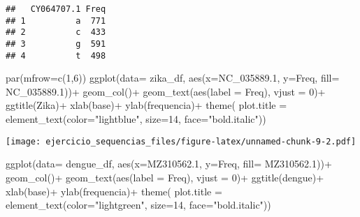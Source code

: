 \documentclass[
]{article}
\newenvironment{Shaded}{\begin{snugshade}}{\end{snugshade}}
\newcommand{\AttributeTok}[1]{\textcolor[rgb]{0.77,0.63,0.00}{#1}}
\newcommand{\DecValTok}[1]{\textcolor[rgb]{0.00,0.00,0.81}{#1}}
\newcommand{\FloatTok}[1]{\textcolor[rgb]{0.00,0.00,0.81}{#1}}
\newcommand{\FunctionTok}[1]{\textcolor[rgb]{0.00,0.00,0.00}{#1}}
\newcommand{\NormalTok}[1]{#1}
\newcommand{\SpecialCharTok}[1]{\textcolor[rgb]{0.00,0.00,0.00}{#1}}
\newcommand{\StringTok}[1]{\textcolor[rgb]{0.31,0.60,0.02}{#1}}
\begin{document}
\begin{verbatim}
##   CY064707.1 Freq
## 1          a  771
## 2          c  433
## 3          g  591
## 4          t  498
\end{verbatim}

\begin{Shaded}
\begin{Highlighting}[]
\FunctionTok{par}\NormalTok{(}\AttributeTok{mfrow=}\FunctionTok{c}\NormalTok{(}\DecValTok{1}\NormalTok{,}\DecValTok{6}\NormalTok{))}
\FunctionTok{ggplot}\NormalTok{(}\AttributeTok{data=}\NormalTok{ zika\_df, }\FunctionTok{aes}\NormalTok{(}\AttributeTok{x=}\NormalTok{NC\_035889}\FloatTok{.1}\NormalTok{, }\AttributeTok{y=}\NormalTok{Freq, }\AttributeTok{fill=}\NormalTok{ NC\_035889}\FloatTok{.1}\NormalTok{))}\SpecialCharTok{+}
   \FunctionTok{geom\_col}\NormalTok{()}\SpecialCharTok{+}
   \FunctionTok{geom\_text}\NormalTok{(}\FunctionTok{aes}\NormalTok{(}\AttributeTok{label =}\NormalTok{ Freq), }\AttributeTok{vjust =} \DecValTok{0}\NormalTok{)}\SpecialCharTok{+}
   \FunctionTok{ggtitle}\NormalTok{(}\StringTok{\textquotesingle{}Zika\textquotesingle{}}\NormalTok{)}\SpecialCharTok{+}
   \FunctionTok{xlab}\NormalTok{(}\StringTok{\textquotesingle{}base\textquotesingle{}}\NormalTok{)}\SpecialCharTok{+}
   \FunctionTok{ylab}\NormalTok{(}\StringTok{\textquotesingle{}frequencia\textquotesingle{}}\NormalTok{)}\SpecialCharTok{+}
   \FunctionTok{theme}\NormalTok{(}
   \AttributeTok{plot.title =}  \FunctionTok{element\_text}\NormalTok{(}\AttributeTok{color=}\StringTok{"lightblue"}\NormalTok{, }\AttributeTok{size=}\DecValTok{14}\NormalTok{, }\AttributeTok{face=}\StringTok{"bold.italic"}\NormalTok{))}
\end{Highlighting}
\end{Shaded}

\texttt{[image: ejercicio\_sequencias\_files/figure-latex/unnamed-chunk-9-2.pdf]}

\begin{Shaded}
\begin{Highlighting}[]
\FunctionTok{ggplot}\NormalTok{(}\AttributeTok{data=}\NormalTok{ dengue\_df, }\FunctionTok{aes}\NormalTok{(}\AttributeTok{x=}\NormalTok{MZ310562}\FloatTok{.1}\NormalTok{, }\AttributeTok{y=}\NormalTok{Freq, }\AttributeTok{fill=}\NormalTok{ MZ310562}\FloatTok{.1}\NormalTok{))}\SpecialCharTok{+}
   \FunctionTok{geom\_col}\NormalTok{()}\SpecialCharTok{+}
   \FunctionTok{geom\_text}\NormalTok{(}\FunctionTok{aes}\NormalTok{(}\AttributeTok{label =}\NormalTok{ Freq), }\AttributeTok{vjust =} \DecValTok{0}\NormalTok{)}\SpecialCharTok{+}
   \FunctionTok{ggtitle}\NormalTok{(}\StringTok{\textquotesingle{}dengue\textquotesingle{}}\NormalTok{)}\SpecialCharTok{+}
   \FunctionTok{xlab}\NormalTok{(}\StringTok{\textquotesingle{}base\textquotesingle{}}\NormalTok{)}\SpecialCharTok{+}
   \FunctionTok{ylab}\NormalTok{(}\StringTok{\textquotesingle{}frequencia\textquotesingle{}}\NormalTok{)}\SpecialCharTok{+}
   \FunctionTok{theme}\NormalTok{(}
   \AttributeTok{plot.title =}  \FunctionTok{element\_text}\NormalTok{(}\AttributeTok{color=}\StringTok{"lightgreen"}\NormalTok{, }\AttributeTok{size=}\DecValTok{14}\NormalTok{, }\AttributeTok{face=}\StringTok{"bold.italic"}\NormalTok{))}
\end{Highlighting}
\end{Shaded}
\end{document}
